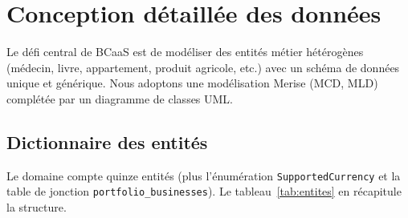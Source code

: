 \chapter{Conception détaillée des données}
\label{chap:donnees}

Le défi central de BCaaS est de modéliser des entités métier hétérogènes (médecin, livre,
appartement, produit agricole, etc.) avec un schéma de données unique et générique. Nous
adoptons une modélisation Merise (MCD, MLD) complétée par un diagramme de classes UML.



\section{Dictionnaire des entités}

Le domaine compte quinze entités (plus l'énumération \texttt{SupportedCurrency} et la table
de jonction \texttt{portfolio\_businesses}). Le tableau~\ref{tab:entites} en récapitule la
structure.

